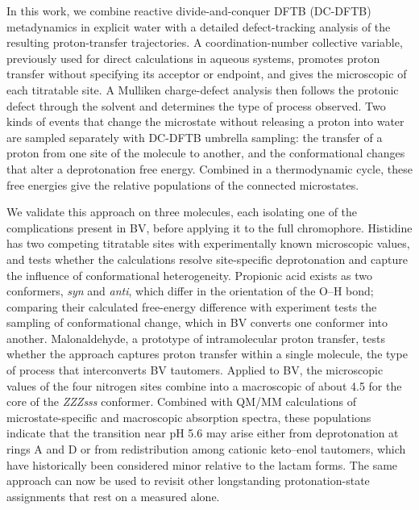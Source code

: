 In this work, we combine reactive divide-and-conquer DFTB (DC-DFTB) metadynamics in explicit water with a detailed defect-tracking analysis of the resulting proton-transfer trajectories.\cite{barducciMetadynamics2011,nishizawaThreePillarsAchieving2016,nakaiDivideandConquerTypeDensityFunctionalTightBinding2016,nishimuraHierarchicalParallelizationDivideandconquer2020}
A coordination-number collective variable, previously used for direct \pka{} calculations in aqueous systems,\cite{Tummanapelli2015Polyprotic,Tummanapelli2015Amino,Sakti2018} promotes proton transfer without specifying its acceptor or endpoint, and gives the microscopic \pka{} of each titratable site.
A Mulliken charge-defect analysis then follows the protonic defect through the solvent and determines the type of process observed.
Two kinds of events that change the microstate without releasing a proton into water are sampled separately with DC-DFTB umbrella sampling: the transfer of a proton from one site of the molecule to another, and the conformational changes that alter a deprotonation free energy.
Combined in a thermodynamic cycle, these free energies give the relative populations of the connected microstates.

We validate this approach on three molecules, each isolating one of the complications present in BV, before applying it to the full chromophore.
Histidine has two competing titratable sites with experimentally known microscopic \pka{} values,\cite{kyte_structure_2006} and tests whether the calculations resolve site-specific deprotonation and capture the influence of conformational heterogeneity.
Propionic acid exists as two conformers, \emph{syn} and \emph{anti}, which differ in the orientation of the O--H bond; comparing their calculated free-energy difference with experiment\cite{macoas_internal_2005} tests the sampling of conformational change, which in BV converts one conformer into another.
Malonaldehyde, a prototype of intramolecular proton transfer,\cite{baughcumMicrowaveSpectroscopicStudy1981,wangFulldimensionalQuantumCalculations2008} tests whether the approach captures proton transfer within a single molecule, the type of process that interconverts BV tautomers.
Applied to BV, the microscopic \pka{} values of the four nitrogen sites combine into a macroscopic \pka{} of about 4.5 for the core of the \emph{ZZZsss} conformer.\cite{tongManyRoadsSeam2026}
Combined with QM/MM calculations of microstate-specific and macroscopic absorption spectra,\cite{groenhofIntroductionQMMM2013} these populations indicate that the transition near pH 5.6 may arise either from deprotonation at rings A and D or from redistribution among cationic keto--enol tautomers, which have historically been considered minor relative to the lactam forms.\cite{nichol_tautomerism_1969,villegas-escobarKetoEnolTautomerism2021a,singer_femtosecond_2014}
The same approach can now be used to revisit other longstanding protonation-state assignments that rest on a measured \pka{} alone.
